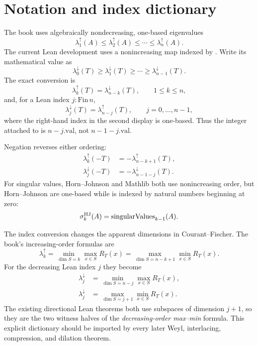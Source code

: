 \section{Notation and index dictionary}

The book uses algebraically nondecreasing, one-based eigenvalues
\[
  \lambda_1^{\uparrow}(A)\le\lambda_2^{\uparrow}(A)\le\cdots\le\lambda_n^{\uparrow}(A).
\]
The current Lean development uses a nonincreasing map indexed by . Write its mathematical value as
\[
  \lambda_0^{\downarrow}(T)\ge\lambda_1^{\downarrow}(T)\ge\cdots\ge
  \lambda_{n-1}^{\downarrow}(T).
\]
The exact conversion is
\begin{equation}
  \lambda_k^{\uparrow}(T)=\lambda_{n-k}^{\downarrow}(T),
  \qquad 1\le k\le n, \tag{HJ-index-up-down}
\end{equation}
and, for a Lean index $j:\mathrm{Fin}\,n$,
\begin{equation}
  \lambda_j^{\downarrow}(T)=\lambda_{n-j}^{\uparrow}(T),
  \qquad j=0,\dots,n-1, \tag{HJ-index-down-up}
\end{equation}
where the right-hand index in the second display is one-based. Thus the integer attached to  is $n-j.\mathrm{val}$, not $n-1-j.\mathrm{val}$.

Negation reverses either ordering:
\begin{align}
  \lambda_k^{\uparrow}(-T)&=-\lambda_{n-k+1}^{\uparrow}(T), \tag{HJ-neg-up}\\
  \lambda_j^{\downarrow}(-T)&=-\lambda_{n-1-j}^{\downarrow}(T). \tag{HJ-neg-down}
\end{align}
For singular values, Horn--Johnson and Mathlib both use nonincreasing order, but Horn--Johnson are one-based while  is indexed by natural numbers beginning at zero:
\[
  \sigma_k^{\mathrm{HJ}}(A)=\operatorname{singularValues}_{k-1}(A).
\]

The index conversion changes the apparent dimensions in Courant--Fischer. The book's increasing-order formulas are
\[
  \lambda_k^{\uparrow}
  =\min_{\dim S=k}\max_{x\in S}R_T(x)
  =\max_{\dim S=n-k+1}\min_{x\in S}R_T(x).
\]
For the decreasing Lean index $j$ they become
\begin{align}
  \lambda_j^{\downarrow}
  &=\min_{\dim S=n-j}\max_{x\in S}R_T(x), \tag{HJ-CF-down-minmax}\\
  \lambda_j^{\downarrow}
  &=\max_{\dim S=j+1}\min_{x\in S}R_T(x). \tag{HJ-CF-down-maxmin}
\end{align}
The existing directional Lean theorems both use subspaces of dimension $j+1$, so they are the two witness halves of the \emph{decreasing-order max--min} formula. This explicit dictionary should be imported by every later Weyl, interlacing, compression, and dilation theorem.

